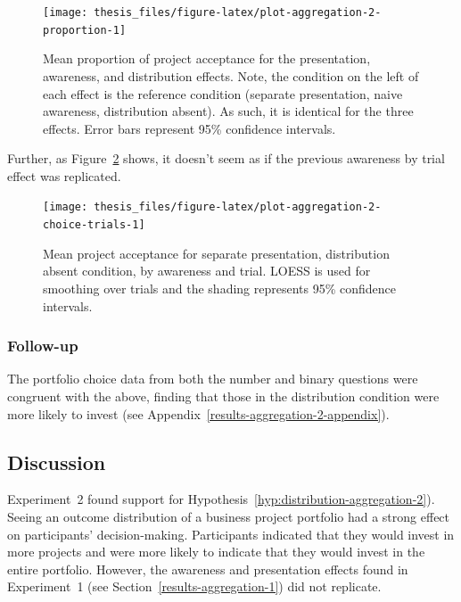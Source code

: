 \documentclass[a4paper, nobind, dvipsnames]{templates/ociamthesis}
\theoremstyle{definition}
\theoremstyle{definition}
\theoremstyle{definition}
\theoremstyle{definition}
\theoremstyle{remark}
\begin{document}
\begin{figure}
\texttt{[image: thesis\_files/figure-latex/plot-aggregation-2-proportion-1]} \caption{Mean proportion of project acceptance for the presentation, awareness, and distribution effects. Note, the condition on the left of each effect is the reference condition (separate presentation, naive awareness, distribution absent). As such, it is identical for the three effects. Error bars represent 95\% confidence intervals.}\label{fig:plot-aggregation-2-proportion}
\end{figure}

Further, as Figure~\ref{fig:plot-aggregation-2-choice-trials} shows, it
doesn't seem as if the previous awareness by trial effect was replicated.



\begin{figure}
\texttt{[image: thesis\_files/figure-latex/plot-aggregation-2-choice-trials-1]} \caption{Mean project acceptance for separate presentation, distribution absent condition, by awareness and trial. LOESS is used for smoothing over trials and the shading represents 95\% confidence intervals.}\label{fig:plot-aggregation-2-choice-trials}
\end{figure}

\subsubsection{Follow-up}

The portfolio choice data from both the number and binary questions were
congruent with the above, finding that those in the distribution condition were
more likely to invest (see Appendix~\ref{results-aggregation-2-appendix}).

\hypertarget{discussion-aggregation-4}{%
\subsection{Discussion}\label{discussion-aggregation-4}}

Experiment~2 found support for
Hypothesis~\ref{hyp:distribution-aggregation-2}). Seeing an outcome
distribution of a business project portfolio had a strong effect on
participants' decision-making. Participants indicated that they would invest in
more projects and were more likely to indicate that they would invest in the
entire portfolio. However, the awareness and presentation effects found in
Experiment~1 (see Section~\ref{results-aggregation-1}) did not replicate.
\end{document}
